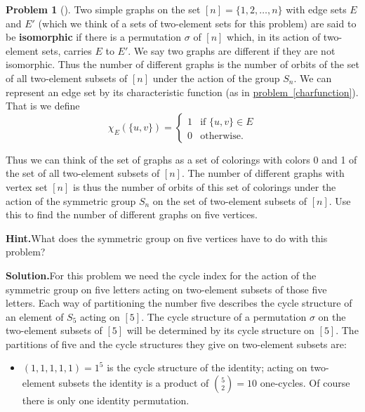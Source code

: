 \documentclass[10pt,]{book}
\newcommand{\terminology}[1]{\textbf{#1}}
\theoremstyle{plain}
\theoremstyle{definition}
\newtheorem{activity}[project]{Problem}
\theoremstyle{definition}
\numberwithin{equation}{chapter}
\newcommand{\amp}{&}
\begin{document}
\begin{activity}[]\label{activity-327}
Two simple graphs on the set \([n]= \{1,2,\ldots, n\}\) with edge sets \(E\) and \(E'\) (which we think of a sets of two-element sets for this problem) are said to be \terminology{isomorphic} if there is a permutation \(\sigma\) of \([n]\) which, in its action of two-element sets, carries \(E\) to \(E'\). We say two graphs are different if they are not isomorphic. Thus the number of different graphs is the number of orbits of the set of all two-element subsets of \([n]\) under the action of the group \(S_n\). We can represent an edge set by its characteristic function (as in \hyperref[charfunction]{problem~\ref{charfunction}}). That is we define%
\begin{equation*}
\chi_E(\{u,v\}) = \left\{
\begin{array}{ll}
1 \amp  \mbox{if \(\{u,v\}\in E\)} \\
0 \amp  \mbox{otherwise.}
\end{array} \right.
\end{equation*}
%
\par
Thus we can think of the set of graphs as a set of colorings with colors 0 and 1 of the set of all two-element subsets of \([n]\). The number of different graphs with vertex set \([n]\) is thus the number of orbits of this set of colorings under the action of the symmetric group \(S_n\) on the set of two-element subsets of \([n]\). Use this to find the number of different graphs on five vertices.%
\par\medskip\noindent%
\textbf{Hint.}\quad What does the symmetric group on five vertices have to do with this problem?%
\par\medskip\noindent%
\textbf{Solution.}\quad For this problem we need the cycle index for the action of the symmetric group on five letters acting on two-element subsets of those five letters. Each way of partitioning the number five describes the cycle structure of an element of \(S_5\) acting on \([5]\). The cycle structure of a permutation \(\sigma\) on the two-element subsets of \([5]\) will be determined by its cycle structure on \([5]\). The partitions of five and the cycle structures they give on two-element subsets are: \leavevmode%
\begin{itemize}[label=\textbullet]
\item{}\((1,1,1,1,1) =1^5\) is the cycle structure of the identity; acting on two-element subsets the identity is a product of \(\binom{5}{2}=10\) one-cycles.  Of course there is only one identity permutation.%

\end{itemize}
\end{activity}
\end{document}
